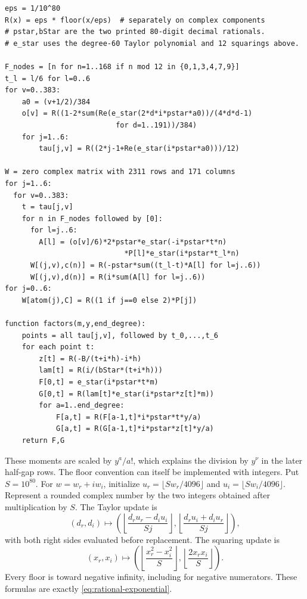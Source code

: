 \begin{lstlisting}[basicstyle=\ttfamily\footnotesize,columns=fullflexible,
breaklines=true,frame=single,caption={Floor-rounded verification: masses and moment factors},label=alg:finite-verification]
eps = 1/10^80
R(x) = eps * floor(x/eps)  # separately on complex components
# pstar,bStar are the two printed 80-digit decimal rationals.
# e_star uses the degree-60 Taylor polynomial and 12 squarings above.

F_nodes = [n for n=1..168 if n mod 12 in {0,1,3,4,7,9}]
t_l = l/6 for l=0..6
for v=0..383:
    a0 = (v+1/2)/384
    o[v] = R((1-2*sum(Re(e_star(2*d*i*pstar*a0))/(4*d*d-1)
                          for d=1..191))/384)
    for j=1..6:
        tau[j,v] = R((2*j-1+Re(e_star(i*pstar*a0)))/12)

W = zero complex matrix with 2311 rows and 171 columns
for j=1..6:
  for v=0..383:
    t = tau[j,v]
    for n in F_nodes followed by [0]:
      for l=j..6:
        A[l] = (o[v]/6)*2*pstar*e_star(-i*pstar*t*n)
                            *P[l]*e_star(i*pstar*t_l*n)
      W[(j,v),c(n)] = R(-pstar*sum((t_l-t)*A[l] for l=j..6))
      W[(j,v),d(n)] = R(i*sum(A[l] for l=j..6))
for j=0..6:
    W[atom(j),C] = R((1 if j==0 else 2)*P[j])

function factors(m,y,end_degree):
    points = all tau[j,v], followed by t_0,...,t_6
    for each point t:
        z[t] = R(-B/(t+i*h)-i*h)
        lam[t] = R(i/(bStar*(t+i*h)))
        F[0,t] = e_star(i*pstar*t*m)
        G[0,t] = R(lam[t]*e_star(i*pstar*z[t]*m))
        for a=1..end_degree:
            F[a,t] = R(F[a-1,t]*i*pstar*t*y/a)
            G[a,t] = R(G[a-1,t]*i*pstar*z[t]*y/a)
    return F,G
\end{lstlisting}

These moments are scaled by $y^a/a!$, which explains the division by
$y^\nu$ in the later half-gap rows.  The floor convention can itself be
implemented with integers.  Put $S=10^{80}$.  For $w=w_r+iw_i$, initialize
$u_r=\lfloor Sw_r/4096\rfloor$ and
$u_i=\lfloor Sw_i/4096\rfloor$.  Represent a rounded complex number by
the two integers obtained after multiplication by $S$.  The Taylor update is
\[
 (d_r,d_i)\longmapsto
 \left(
 \left\lfloor\frac{d_ru_r-d_iu_i}{Sj}\right\rfloor,
 \left\lfloor\frac{d_ru_i+d_iu_r}{Sj}\right\rfloor
 \right),
\]
with both right sides evaluated before replacement.  The squaring update is
\[
 (x_r,x_i)\longmapsto
 \left(
 \left\lfloor\frac{x_r^2-x_i^2}{S}\right\rfloor,
 \left\lfloor\frac{2x_rx_i}{S}\right\rfloor
 \right).
\]
Every floor is toward negative infinity, including for negative numerators.
These formulas are exactly \eqref{eq:rational-exponential}.

